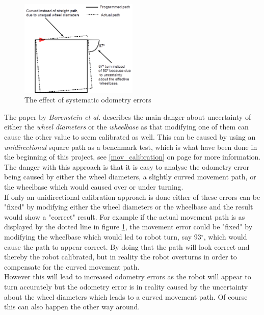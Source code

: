 \begin{figure}[h]
\centering
\includegraphics[width = 0.5\textwidth]{../../figures/sys_odometry_error}
\caption{The effect of systematic odometry errors}
\label{sys_error}
\end{figure}

The paper by \textit{Borenstein et al.} describes the main danger about uncertainty of either the \textit{wheel diameters} or the \textit{wheelbase} as that modifying one of them can cause the other value to seem calibrated as well. This can be caused by using an \textit{unidirectional} square path as a benchmark test, which is what have been done in the beginning of this project, see \ref{mov_calibration} on page \pageref{mov_calibration} for more information. \\
The danger with this approach is that it is easy to analyse the odometry error being caused by either the wheel diameters, a slightly curved movement path, or the wheelbase which would caused over or under turning. \\
If only an unidirectional calibration approach is done either of these errors can be "fixed" by modifying either the wheel diameters or the wheelbase and the result would show a "correct" result.
For example if the actual movement path is as displayed by the dotted line in figure \ref{sys_error}, the movement error could be "fixed" by modifying the wheelbase which would led to robot turn, say 93$^{\circ}$, which would cause the path to appear correct. By doing that the path will look correct and thereby the robot calibrated, but in reality the robot overturns in order to compensate for the curved movement path.\\
However this will lead to increased odometry errors as the robot will appear to turn accurately but the odometry error is in reality caused by the uncertainty about the wheel diameters which leads to a curved movement path. Of course this can also happen the other way around.\\


